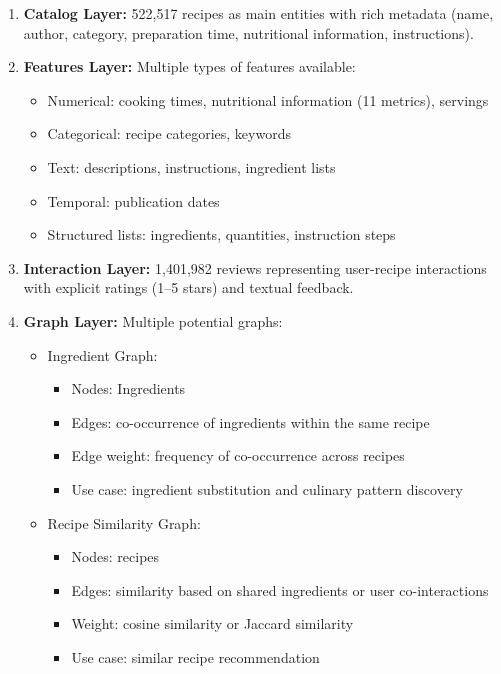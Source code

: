 \documentclass[11pt,a4paper]{article}
\begin{document}
\begin{enumerate}
    \item \textbf{Catalog Layer:} 522,517 recipes as main entities with rich metadata (name, author, category, preparation time, nutritional information, instructions).

    \item \textbf{Features Layer:} Multiple types of features available:
    \begin{itemize}
        \item Numerical: cooking times, nutritional information (11 metrics), servings
        \item Categorical: recipe categories, keywords
        \item Text: descriptions, instructions, ingredient lists
        \item Temporal: publication dates
        \item Structured lists: ingredients, quantities, instruction steps
    \end{itemize}

    \item \textbf{Interaction Layer:} 1,401,982 reviews representing user-recipe interactions with explicit ratings (1--5 stars) and textual feedback.

    \item \textbf{Graph Layer:} Multiple potential graphs:
    \begin{itemize}
        \item Ingredient Graph:
        \begin{itemize}
            \item Nodes: Ingredients
            \item Edges: co-occurrence of ingredients within the same recipe
            \item Edge weight: frequency of co-occurrence across recipes
            \item Use case: ingredient substitution and culinary pattern discovery
        \end{itemize}

        \item Recipe Similarity Graph:
        \begin{itemize}
            \item Nodes: recipes
            \item Edges: similarity based on shared ingredients or user co-interactions
            \item Weight: cosine similarity or Jaccard similarity
            \item Use case: similar recipe recommendation
        \end{itemize}


\end{itemize}
\end{enumerate}
\end{document}

